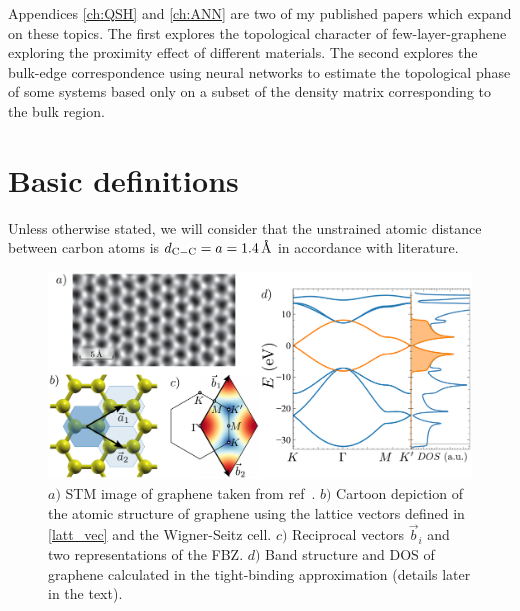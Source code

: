 Appendices \ref{ch:QSH} and \ref{ch:ANN} are two of my published papers which expand on these topics. The first explores the topological character of few-layer-graphene exploring the proximity effect of different materials. The second explores the bulk-edge correspondence\cite{Hasan2010} using neural networks to estimate the topological phase of some systems based only on a subset of the density matrix corresponding to the bulk region.



\section{Basic definitions}
Unless otherwise stated, we will consider that the unstrained atomic distance between carbon atoms is $d_{\ce{C}-\ce{C}}=a=\SI{1.4}{\angstrom}$ in accordance with literature\cite{KatsnelsonBook, Cooper2012, Ishigami2007}. %

\begin{figure}[!ht]
\centering
\includegraphics{graphene/figures/graphene_summary.pdf}
\vspace{-5pt}
\caption{$a)$ STM image of graphene taken from ref~\cite{Huang2011}. $b)$ Cartoon depiction of the atomic structure of graphene using the lattice vectors defined in \eqref{latt_vec} and the Wigner-Seitz cell. $c)$ Reciprocal vectors $\vec{b}_i$ and two representations of the FBZ. $d)$ Band structure and DOS of graphene calculated in the tight-binding approximation (details later in the text).}
\label{graphene_summary}
\end{figure}

